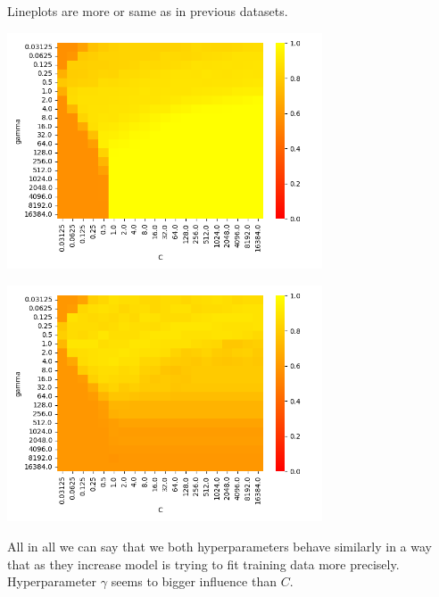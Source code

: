 \documentclass[a4paper]{article}
\begin{document}
	Lineplots are more or same as in previous datasets.
	
	\centerline{\includegraphics[width=0.7\textwidth]{dataset_3_train_heatmap_scores}}  
	
	\centerline{\includegraphics[width=0.7\textwidth]{dataset_3_validation_heatmap_scores}}  
	
	
	All in all we can say that we both hyperparameters behave similarly in a way that as they increase model is trying to fit training data more precisely. Hyperparameter $\gamma$ seems to bigger influence than $C$.
	  
\end{document}
